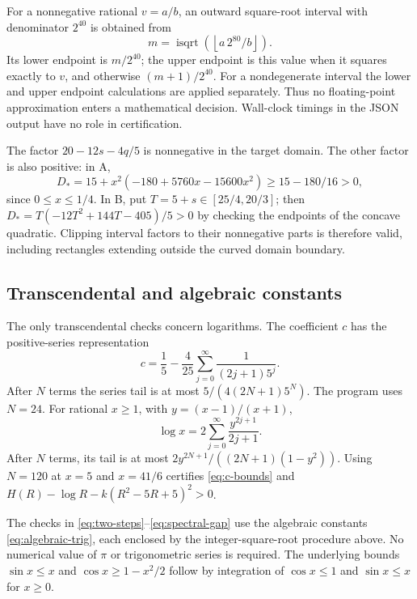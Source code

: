 \documentclass[11pt]{article}
\theoremstyle{remark}
\numberwithin{equation}{section}
\begin{document}
For a nonnegative rational $v=a/b$, an outward square-root interval
with denominator $2^{40}$ is obtained from
\[
 m=\operatorname{isqrt}\left(\left\lfloor
              a\,2^{80}/b\right\rfloor\right).
\]
Its lower endpoint is $m/2^{40}$; the upper endpoint is this value
when it squares exactly to $v$, and otherwise $(m+1)/2^{40}$.
For a nondegenerate interval the lower and upper endpoint calculations
are applied separately. Thus no floating-point approximation enters
a mathematical decision. Wall-clock timings in the JSON output have
no role in certification.

The factor $20-12s-4q/5$ is nonnegative in the target domain.
The other factor is also positive: in A,
\[
 D_*=15+x^2(-180+5760x-15600x^2)\ge15-180/16>0,
\]
since $0\le x\le1/4$.
In B, put $T=5+s\in[25/4,20/3]$; then
$D_*=T(-12T^2+144T-405)/5>0$ by checking the endpoints of the
concave quadratic. Clipping interval factors to their nonnegative
parts is therefore valid, including rectangles extending outside the
curved domain boundary.

\subsection{Transcendental and algebraic constants}
The only transcendental checks concern logarithms.
The coefficient $c$ has the positive-series representation
\[
 c=\frac15-\frac4{25}\sum_{j=0}^{\infty}
                \frac1{(2j+1)5^j}.
\]
After $N$ terms the series tail is at most
$5/(4(2N+1)5^N)$. The program uses $N=24$.
For rational $x\ge1$, with $y=(x-1)/(x+1)$,
\[
 \log x=2\sum_{j=0}^{\infty}\frac{y^{2j+1}}{2j+1}.
\]
After $N$ terms, its tail is at most
$2y^{2N+1}/((2N+1)(1-y^2))$.
Using $N=120$ at $x=5$ and $x=41/6$ certifies
\eqref{eq:c-bounds} and
$H(R)-\log R-k(R^2-5R+5)^2>0$.

The checks in \eqref{eq:two-steps}--\eqref{eq:spectral-gap}
use the algebraic constants \eqref{eq:algebraic-trig}, each enclosed by
the integer-square-root procedure above.
No numerical value of $\pi$ or trigonometric series is required.
The underlying bounds $\sin x\le x$ and $\cos x\ge1-x^2/2$ follow
by integration of $\cos x\le1$ and $\sin x\le x$ for $x\ge0$.
\end{document}

